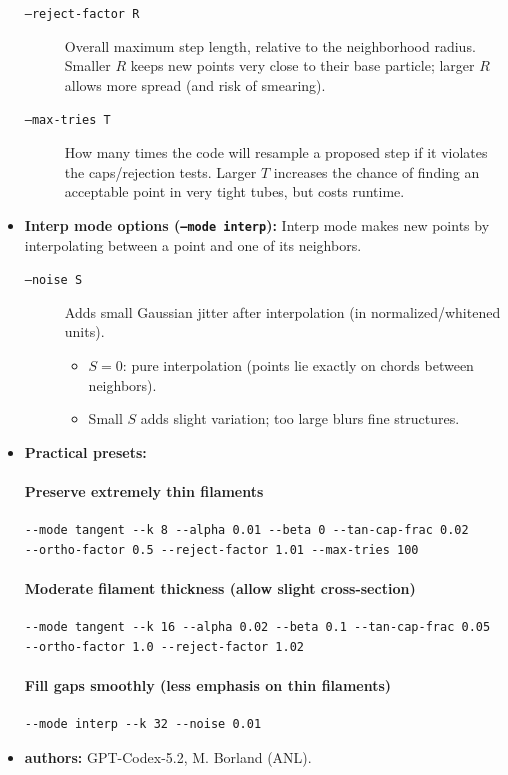 \documentclass[11pt]{article}
\begin{document}
\begin{itemize}
\begin{description}
  \item[\texttt{--reject-factor R}] Overall maximum step length, relative to the neighborhood radius. Smaller $R$ keeps new points very close to their base particle; larger $R$ allows more spread (and risk of smearing).

  \item[\texttt{--max-tries T}] How many times the code will resample a proposed step if it violates the caps/rejection tests. Larger $T$ increases the chance of finding an acceptable point in very tight tubes, but costs runtime.
\end{description}

\item \textbf{Interp mode options (\texttt{--mode interp}):}
  Interp mode makes new points by interpolating between a point and one of its neighbors.
\begin{description}
  \item[\texttt{--noise S}] Adds small Gaussian jitter after interpolation (in normalized/whitened units).
  \begin{itemize}
    \item $S=0$: pure interpolation (points lie exactly on chords between neighbors).
    \item Small $S$ adds slight variation; too large blurs fine structures.
  \end{itemize}
\end{description}

\item \textbf{Practical presets:}
\paragraph{Preserve extremely thin filaments}
\begin{verbatim}
--mode tangent --k 8 --alpha 0.01 --beta 0 --tan-cap-frac 0.02
--ortho-factor 0.5 --reject-factor 1.01 --max-tries 100
\end{verbatim}

\paragraph{Moderate filament thickness (allow slight cross-section)}
\begin{verbatim}
--mode tangent --k 16 --alpha 0.02 --beta 0.1 --tan-cap-frac 0.05
--ortho-factor 1.0 --reject-factor 1.02
\end{verbatim}

\paragraph{Fill gaps smoothly (less emphasis on thin filaments)}
\begin{verbatim}
--mode interp --k 32 --noise 0.01
\end{verbatim}
\item {\bf authors:} GPT-Codex-5.2, M. Borland (ANL).
\end{itemize}
\end{document}
